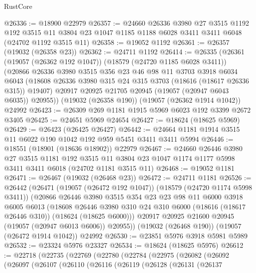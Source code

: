 \begin{lexlean}{RustCore}
\begin{coremodule}
@26336 := @18900 @22979
@26357 := @24660
    @26336
    @3980
    @27
    @3515
    @1192
    @192
    @3515
    @11
    @3804
    @23
    @1047
    @1185
    @1188
    @6028
    @3411
    @3411
    @6048
    (@24702 @1192 @3515 @11)
@26358 := @19052 @1192
@26361 := @26357 (@19032 (@26358 @23))
@26362 := @24711 @1192
@26414 := @26335
    (@26361
      (@19057 (@26362 @192 @1047))
      (@18579 (@24720 @1185 @6028 @3411))
      (@20866
        @26336
        @3980
        @3515
        @356
        @23
        @46
        @98
        @11
        @3703
        @3918
        @6034
        @6043
        (@18608 @26336 @3980 @315 @24 @315 @3703 (@18616 (@18617 @26336 @315)) @19407)
        @20917
        @20925
        @21705
        @20945
        (@19057 (@20947 @6043 @6035))
        @20955))
    (@19032 (@26358 @190))
    (@19057 (@26362 @1914 @1042))
    @24992
@26423 := @26309 @269 @1181 @1915 @5969 @6023 @192 @3399 @2672 @3405
@26425 := @24651 @5969 @24654
@26427 := @18624 (@18625 @5969)
@26429 := @26423 (@26425 @26427)
@26442 := @24664 @1181 @1914 @3515 @11 @6022 @190 @1042 @192 @959 @5451 @3411 @3411 @5994
@26446 := @18551 (@18901 (@18636 @18902)) @22979
@26467 := @24660
    @26446
    @3980
    @27
    @3515
    @1181
    @192
    @3515
    @11
    @3804
    @23
    @1047
    @1174
    @1177
    @5998
    @3411
    @3411
    @6018
    (@24702 @1181 @3515 @11)
@26468 := @19052 @1181
@26471 := @26467 (@19032 (@26468 @23))
@26472 := @24711 @1181
@26526 := @26442
    (@26471
      (@19057 (@26472 @192 @1047))
      (@18579 (@24720 @1174 @5998 @3411))
      (@20866
        @26446
        @3980
        @3515
        @354
        @23
        @23
        @98
        @11
        @6000
        @3918
        @6005
        @6013
        (@18608
          @26446
          @3980
          @310
          @24
          @310
          @6000
          (@18616 (@18617 @26446 @310))
          (@18624 (@18625 @6000)))
        @20917
        @20925
        @21600
        @20945
        (@19057 (@20947 @6013 @6006))
        @20955))
    (@19032 (@26468 @190))
    (@19057 (@26472 @1914 @1042))
    @24992
@26530 := @23851 @5976 @3918 @5981 @5989
@26532 := @23324 @5976 @23327
@26534 := @18624 (@18625 @5976)
@26612 := @22718
    (@22735
      (@22769
        (@22780
          (@22784
            (@22975
              (@26082
                (@26092
                  (@26097
                    (@26107
                      (@26110
                        (@26116
                          (@26119
                            (@26128
                              (@26131
                                (@26137

\end{coremodule}
\end{lexlean}
